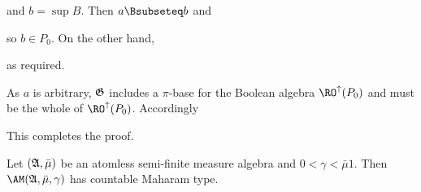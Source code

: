 {\noindent and $b=\sup B$.   Then $a\Bsubseteq b$ and


\noindent so $b\in P_0$.   On the other hand,


\noindent as required.\ \Qed

\medskip

 As $a$ is arbitrary, $\frak G$ includes a $\pi$-base for
the Boolean algebra $\RO^{\uparrow}(P_0)$ and must be the whole of
$\RO^{\uparrow}(P_0)$.   Accordingly


\noindent This completes the proof.
}%

Let $(\frak A,\bar\mu)$ be an atomless semi-finite
measure algebra and $0<\gamma<\bar\mu 1$.   Then
$\AM(\frak A,\bar\mu,\gamma)$ has countable Maharam type.

